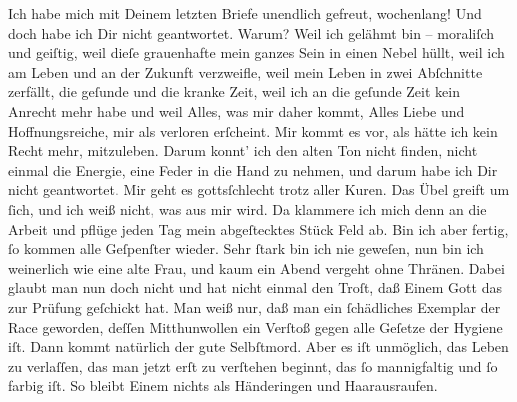 \pstart
           Ich habe mich mit Deinem letzten Briefe unendlich gefreut, wochenlang! Und doch habe
               ich Dir nicht geantwortet. Warum? Weil ich gelähmt bin – moraliſch und geiſtig, weil
                  dieſe grauenhafte \label{K_L02711-1v}\label{K_L02711-1} mein ganzes Sein in einen Nebel hüllt, weil ich am Leben und an der Zukunft
               verzweifle, weil mein Leben {\pb}in zwei Abſchnitte
               zerfällt, die geſunde und die kranke Zeit, weil ich an die geſunde Zeit kein Anrecht
               mehr habe und weil Alles, was mir daher kommt, Alles Liebe und Hoffnungsreiche, mir
               als verloren erſcheint. Mir kommt es vor, als hätte ich kein Recht mehr, mitzuleben.
               Darum konnt’ ich den alten Ton nicht finden, nicht einmal die Energie, eine Feder in
               die Hand zu nehmen, und darum habe ich Dir nicht geantwortet\textcolor{gray}{.} Mir
               geht es gottsſchlecht trotz aller Kuren. Das Übel greift um ſich, und ich weiß
                  nicht\textcolor{gray}{,} was aus mir wird. Da klammere ich mich denn an die
               Arbeit und pflüge jeden Tag mein abgeſtecktes Stück Feld ab. Bin ich aber fertig, ſo
               kommen alle Geſpenſter {\pb}wieder. Sehr ſtark bin ich
               nie geweſen, nun bin ich weinerlich wie eine alte Frau, und kaum ein Abend vergeht
               ohne Thränen. Dabei glaubt man nun doch nicht und hat nicht einmal den Troſt, daß
               Einem Gott das zur Prüfung geſchickt hat. Man weiß nur, daß man ein ſchädliches
               Exemplar der Race geworden, deſſen Mitthunwollen ein Verſtoß gegen alle Geſetze der
               Hygiene iſt. Dann kommt natürlich der gute Selbſtmord. Aber es iſt unmöglich, das
               Leben zu verlaſſen, das man jetzt erſt zu verſtehen beginnt, das ſo mannigfaltig und
               ſo farbig iſt. So bleibt Einem nichts als Händeringen und Haarausraufen.\pend
           
